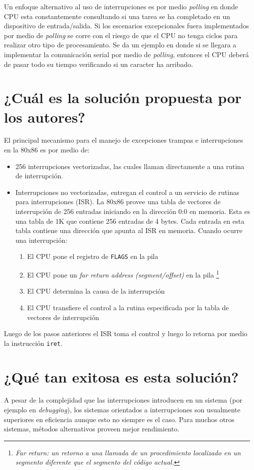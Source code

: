Un enfoque alternativo al uso de interrupciones es por medio \textit{polling} en donde CPU esta constantemente consultando si una tarea se ha completado en un dispositivo de entrada/salida. Si los escenarios excepcionales fuera implementados por medio de \textit{polling} se corre con el riesgo de que el CPU no tenga ciclos para realizar otro tipo de procesamiento. Se da un ejemplo en donde si se llegara a implementar la comunicación serial por medio de \textit{polling}, entonces el CPU deberá de pasar todo su tiempo verificando si un caracter ha arribado.

\section{¿Cuál es la solución propuesta por los autores?}
El principal mecanismo para el manejo de excepciones trampas e interrupciones en la 80x86 es por medio de: 
\begin{itemize}
    \item 256 interrupciones vectorizadas, las cuales llaman directamente a una rutina de interrupción.
    \item Interrupciones no vectorizadas, entregan el control a un servicio de rutinas para interrupciones (ISR). La 80x86 provee una tabla de vectores de interrupción de 256 entradas iniciando en la dirección 0:0 en memoria. Esta es una tabla de 1K que contiene 256 entradas de 4 bytes. Cada entrada en esta tabla contiene una dirección que apunta al ISR en memoria. Cuando ocurre una interrupción:
    \begin{enumerate}
        \item El CPU pone el registro de \texttt{FLAGS} en la pila
        \item El CPU pone un \textit{far return address (segment/offset)} en la pila \footnote{\textit{Far return: un retorno a una llamada de un procedimiento localizado en un segmento diferente que el segmento del código actual.}}  
        \item El CPU determina la causa de la interrupción
        \item El CPU transfiere el control a la rutina especificada por la tabla de vectores de  interrupción
    \end{enumerate}
\end{itemize}
Luego de los pasos anteriores el ISR toma el control y luego lo retorna por medio la instrucción \texttt{iret}.

\section{¿Qué tan exitosa es esta solución?}
A pesar de la complejidad que las interrupciones introducen en un sistema (por ejemplo en \textit{debugging}), los sistemas orientados a interrupciones son usualmente superiores en eficiencia aunque esto no siempre es el caso. Para muchos otros sistemas, métodos alternativos proveen mejor rendimiento.




